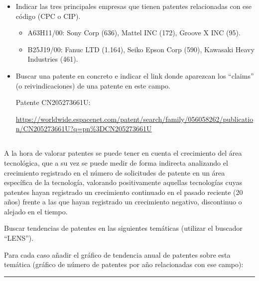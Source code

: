 \begin{itemize}
    \item Indicar las tres principales empresas que tienen patentes relacionadas con ese código (CPC o CIP).
    \begin{itemize}
        \item A63H11/00: Sony Corp (636), Mattel INC (172), Groove X INC (95).
        \item B25J19/00: Fanuc LTD (1.164), Seiko Epson Corp (590), Kawasaki Heavy Industries (461).
    \end{itemize}

    \item Buscar una patente en concreto e indicar el link donde aparezcan los “claims” (o reivindicaciones) de una patente en este campo.
    
    Patente CN205273661U:

    \url{https://worldwide.espacenet.com/patent/search/family/056058262/publication/CN205273661U?q=pn%3DCN205273661U}
\end{itemize}


\subsection{}

A la hora de valorar patentes se puede tener en cuenta el crecimiento del área tecnológica, que a su vez se puede medir de forma indirecta analizando el crecimiento registrado en el número de solicitudes de patente en un área específica de la tecnología, valorando positivamente aquellas tecnologías cuyas patentes hayan registrado un crecimiento continuado en el pasado reciente (20 años) frente a las que hayan registrado un crecimiento negativo, discontinuo o alejado en el tiempo.

Buscar tendencias de patentes en las siguientes temáticas (utilizar el buscador “LENS”).

Para cada caso añadir el gráfico de tendencia anual de patentes sobre esta temática (gráfico de número de patentes por año relacionadas con ese campo):

\par\noindent\rule{\textwidth}{0.4pt}

